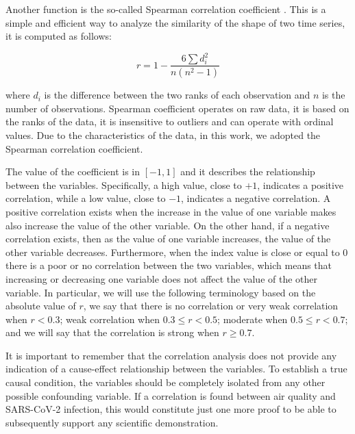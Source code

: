 \documentclass[review]{elsarticle}
\begin{document}
Another function is the so-called Spearman correlation coefficient \cite{myers2004s}. This is a simple and efficient way to analyze the similarity of the shape of two time series, it is computed as follows:

\begin{displaymath}
	r = 1 - \frac{\displaystyle 6 \sum d_{i}^2}{n(n^2-1)}
\end{displaymath}

where 
$d_{i}$ is the difference between the two ranks of each observation and $n$ is the number of observations. Spearman coefficient operates on raw data, it is based on the ranks of the data, it is insensitive to outliers and can operate with ordinal values. 
Due to the characteristics of the data, in this work, we adopted the Spearman correlation coefficient.

The value of the coefficient is in $[-1,1]$ and it describes the relationship between the variables. Specifically, a high value, close to $+1$, indicates a positive correlation, while a low value, close to $-1$, indicates a negative correlation. A positive correlation exists when the increase in the value of one variable makes also increase the value of the other variable. On the other hand, if a negative correlation exists, then as the value of one variable increases, the value of the other variable decreases.
Furthermore, when the index value is close or equal to $0$ there is a poor or no correlation between the two variables, which means that increasing or decreasing one variable does not affect the value of the other variable.
In particular, we will use the following terminology based on the absolute value of $r$, we say that there is 
no correlation or very weak correlation when $r < 0.3$; weak correlation when $0.3 \leq r <0.5$; moderate when $0.5 \leq r < 0.7$; and we will say that the correlation is strong when $r \geq 0.7$.




It is important to remember that the correlation analysis does not provide any indication of a cause-effect relationship between the variables. To establish a true causal condition, the variables should be completely isolated from any other possible confounding variable. If a correlation is found between air quality and SARS-CoV-2 infection, this would constitute just one more proof to be able to subsequently support any scientific demonstration.
\end{document}
